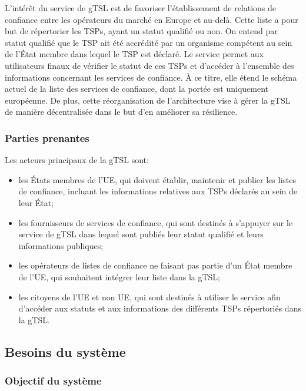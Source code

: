 \documentclass{tnreport}
\begin{document}
L'intérêt du service de gTSL est de favoriser l'établissement de relations de confiance entre les opérateurs du marché en Europe et au-delà. Cette liste a pour but de répertorier les TSPs, ayant un statut qualifié ou non. On entend par statut qualifié que le TSP ait été accrédité par un organisme compétent au sein de l’État membre dans lequel le TSP est déclaré. Le service permet aux utilisateurs finaux de vérifier le statut de ces TSPs et d'accéder à l'ensemble des informations concernant les services de confiance. À ce titre, elle étend le schéma actuel de la liste des services de confiance, dont la portée est uniquement européenne. De plus, cette réorganisation de l'architecture vise à gérer la gTSL de manière décentralisée dans le but d'en améliorer sa résilience.

\subsubsection{Parties prenantes}

Les acteurs principaux de la gTSL sont:
\begin{itemize}
	\item les États membres de l'UE, qui doivent établir, maintenir et publier les listes de confiance, incluant les informations relatives aux TSPs déclarés au sein de leur État;
	\item les fournisseurs de services de confiance, qui sont destinés à s'appuyer sur le service de gTSL dans lequel sont publiés leur statut qualifié et leurs informations publiques;
	\item les opérateurs de listes de confiance ne faisant pas partie d'un État membre de l'UE, qui souhaitent intégrer leur liste dans la gTSL;
	\item les citoyens de l'UE et non UE, qui sont destinés à utiliser le service afin d'accéder aux statuts et aux informations des différents TSPs répertoriés dans la gTSL.
	\newline
\end{itemize}

\subsection{Besoins du système}
\label{sec:system-requirements}

\subsubsection{Objectif du système}
\end{document}
